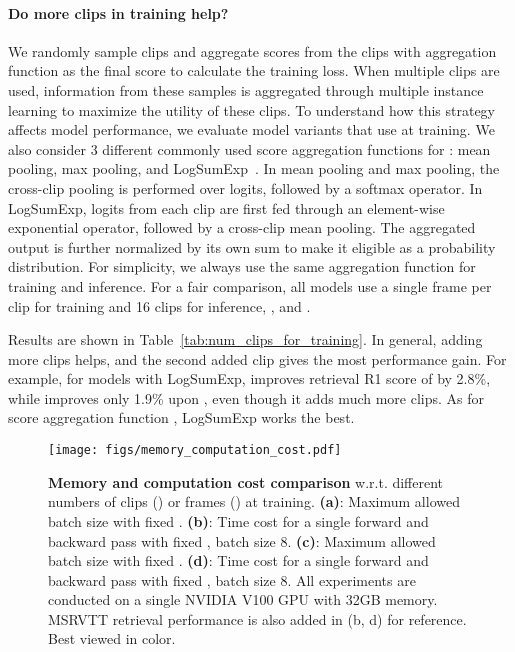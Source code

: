 \paragraph{Do more clips in training help?} 
We randomly sample  clips and aggregate scores from the clips with aggregation function  as the final score to calculate the training loss.
When multiple clips are used, information from these samples is aggregated through multiple instance learning to maximize the utility of these clips. 
To understand how this strategy affects model performance, we evaluate model variants that use  at training.
We also consider 3 different commonly used score aggregation functions for : mean pooling, max pooling, and LogSumExp~\cite{miech2020end}. In mean pooling and max pooling, the cross-clip pooling is performed over logits, followed by a softmax operator. In LogSumExp, logits from each clip are first fed through an element-wise exponential operator, followed by a cross-clip mean pooling. The aggregated output is further normalized by its own sum to make it eligible as a probability distribution. For simplicity, we always use the same aggregation function for training and inference. 
For a fair comparison, all models use a single frame per clip for training and 16 clips for inference, \ie,  and .


Results are shown in Table~\ref{tab:num_clips_for_training}.
In general, adding more clips helps, and the second added clip gives the most performance gain. 
For example, for models with LogSumExp,  improves retrieval R1 score of  by 2.8\%, while  improves only 1.9\% upon , even though it adds much more clips.
As for score aggregation function , LogSumExp works the best. 



\begin{figure}[!t]
  \centering
  \texttt{[image: figs/memory\_computation\_cost.pdf]}
  \vspace{-3mm}
  \caption{
\textbf{Memory and computation cost comparison} w.r.t. different numbers of clips () or frames () at training. 
\textbf{(a)}: Maximum allowed batch size with fixed . 
\textbf{(b)}: Time cost for a single forward and backward pass with fixed , batch size 8. 
\textbf{(c)}: Maximum allowed batch size with fixed . 
\textbf{(d)}: Time cost for a single forward and backward pass with fixed , batch size 8.
All experiments are conducted on a single NVIDIA V100 GPU with 32GB memory. 
MSRVTT retrieval performance is also added in (b, d) for reference. Best viewed in color.
}
  \label{fig:memory_computation_cost}
  \vspace{-3mm}
\end{figure}



